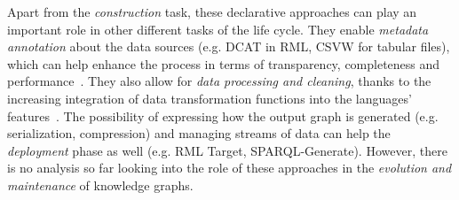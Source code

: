 Apart from the \textit{construction} task, these declarative approaches can play an important role in other different tasks of the life cycle. They enable \textit{metadata annotation} about the data sources (e.g. DCAT in RML, CSVW for tabular files), which can help enhance the process in terms of transparency, completeness and performance~\parencite{chaves2021morph-csv,vidal2023knowledge}. 
They also allow for \textit{data processing and cleaning}, thanks to the increasing integration of data transformation functions into the languages' features~\parencite{debruyne2016r2rmlf,junior2016funul,jozashoori2020funmap,DeMeester2017fno_dbpedia}.
The possibility of expressing how the output graph is generated (e.g. serialization, compression) and managing streams of data can help the \textit{deployment} phase as well (e.g. RML Target, SPARQL-Generate). However, there is no analysis so far looking into the role of these approaches in the \textit{evolution and maintenance} of knowledge graphs. 



